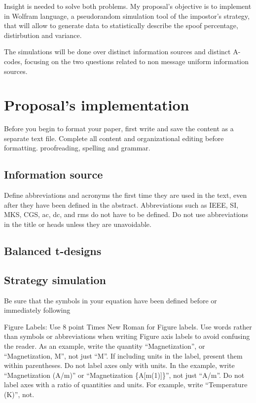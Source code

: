 \documentclass[conference]{IEEEtran}
\begin{document}
Insight is needed to solve both problems. My proposal's objective is to implement in Wolfram language, a pseudorandom simulation tool of the impostor's strategy, that will allow to generate data to statistically describe the spoof percentage, distirbution and variance.

The simulations will be done over distinct information sources and distinct A-codes, focusing on the two questions related to non message uniform information sources.

%
%
\section{Proposal's implementation}
Before you begin to format your paper, first write and save the content as a
separate text file. Complete all content and organizational editing before
formatting.
proofreading, spelling and grammar.

\subsection{Information source}\label{AA}
Define abbreviations and acronyms the first time they are used in the text,
even after they have been defined in the abstract. Abbreviations such as
IEEE, SI, MKS, CGS, ac, dc, and rms do not have to be defined. Do not use
abbreviations in the title or heads unless they are unavoidable.

\subsection{Balanced t-designs}

\subsection{Strategy simulation}

Be sure that the
symbols in your equation have been defined before or immediately following


Figure Labels: Use 8 point Times New Roman for Figure labels. Use words
rather than symbols or abbreviations when writing Figure axis labels to
avoid confusing the reader. As an example, write the quantity
``Magnetization'', or ``Magnetization, M'', not just ``M''. If including
units in the label, present them within parentheses. Do not label axes only
with units. In the example, write ``Magnetization (A/m)'' or ``Magnetization
\{A[m(1)]\}'', not just ``A/m''. Do not label axes with a ratio of
quantities and units. For example, write ``Temperature (K)'', not.
\end{document}

